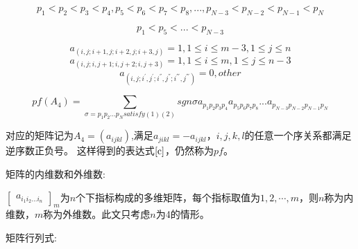 \documentclass{amsc}          %
\numberwithin{equation}{section} %
\begin{document}
    \begin{equation}\label{a}p_{1}<p_{2}<p_{3}<p_{4},p_{5}<p_{6}<p_{7}<p_{8}
   ,...,p_{N-3}<p_{N-2}<p_{N-1}<p_{N}\end{equation}

   \begin{equation}\label{b}p_{1}<p_{5}<...<p_{N-3}\end{equation}

   \begin{equation}a_{(i,j;i+1,j;i+2,j;i+3,j)}=1,1\leq i \leq m-3,1\leq j\leq n\end{equation}
   \begin{equation}a_{(i,j;i,j+1;i,j+2;i,j+3)}=1,1\leq i \leq m,1\leq j\leq n-3\end{equation}
   \begin{equation}a_{(i,j;i^{'},j^{'};i^{''},j^{''};i^{'''},j^{'''})}=0,other \end{equation}

   \begin{equation}\label{c}pf(A_{4})=\sum\limits_{\sigma=p_{1}p_{2}...p_{N}satisfy(1)(2)}sgn\sigma a_{p_{1}p_{2}p_{3}p_{4}}a_{p_{5}p_{6}p_{7}p_{8}}...a_{p_{N-3}p_{N-2}p_{N-1}p_{N}}\end{equation}

   对应的矩阵记为$A_{4}=(a_{ijkl})$,满足$a_{jikl}=-a_{ijkl}$，$i,j,k,l$的任意一个序关系都满足逆序数正负号。
   这样得到的表达式$\ref{c}$，仍然称为$pf$。



\begin{definition} 矩阵的内维数和外维数:

$\begin{bmatrix}
a_{i_{1}i_{2}...i_{n}}\end{bmatrix}_{m}$为$n$个下指标构成的多维矩阵，每个指标取值为$1,2,\cdots,m$，则$n$称为内维数，$m$称为外维数。此文只考虑$n$为4的情形。
\end{definition}

\begin{definition} 矩阵行列式:
\end{definition}
\end{document}
